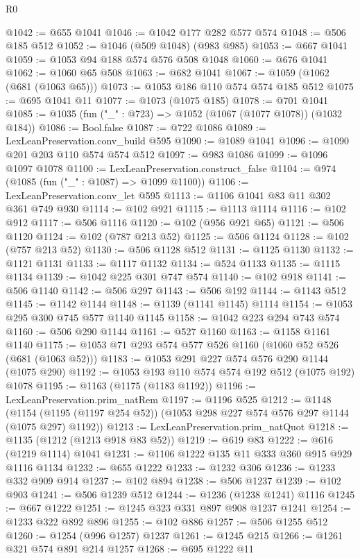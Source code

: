 \begin{lexlean}{R0}
\begin{coremodule}
@1042 := @655 @1041
@1046 := @1042 @177 @282 @577 @574
@1048 := @506 @185 @512
@1052 := @1046 (@509 @1048) (@983 @985)
@1053 := @667 @1041
@1059 := @1053 @94 @188 @574 @576 @508 @1048
@1060 := @676 @1041
@1062 := @1060 @65 @508
@1063 := @682 @1041
@1067 := @1059 (@1062 (@681 (@1063 @65)))
@1073 := @1053 @186 @110 @574 @574 @185 @512
@1075 := @695 @1041 @11
@1077 := @1073 (@1075 @185)
@1078 := @701 @1041
@1085 := @1035 (fun ("_" : @723) => @1052 (@1067 (@1077 @1078)) (@1032 @184))
@1086 := Bool.false
@1087 := @722 @1086
@1089 := LexLeanPreservation.conv_build @595
@1090 := @1089 @1041
@1096 := @1090 @201 @203 @110 @574 @574 @512
@1097 := @983 @1086
@1099 := @1096 @1097 @1078
@1100 := LexLeanPreservation.construct_false
@1104 := @974 (@1085 (fun ("_" : @1087) => @1099 @1100))
@1106 := LexLeanPreservation.conv_let @595
@1113 := @1106 @1041 @83 @11 @302 @361 @749 @930
@1114 := @102 @921
@1115 := @1113 @1114
@1116 := @102 @912
@1117 := @506 @1116
@1120 := @102 (@956 @921 @65)
@1121 := @506 @1120
@1124 := @102 (@787 @213 @52)
@1125 := @506 @1124
@1128 := @102 (@757 @213 @52)
@1130 := @506 @1128 @512
@1131 := @1125 @1130
@1132 := @1121 @1131
@1133 := @1117 @1132
@1134 := @524 @1133
@1135 := @1115 @1134
@1139 := @1042 @225 @301 @747 @574
@1140 := @102 @918
@1141 := @506 @1140
@1142 := @506 @297
@1143 := @506 @192
@1144 := @1143 @512
@1145 := @1142 @1144
@1148 := @1139 (@1141 @1145) @1114
@1154 := @1053 @295 @300 @745 @577 @1140 @1145
@1158 := @1042 @223 @294 @743 @574
@1160 := @506 @290 @1144
@1161 := @527 @1160
@1163 := @1158 @1161 @1140
@1175 := @1053 @71 @293 @574 @577 @526 @1160 (@1060 @52 @526 (@681 (@1063 @52)))
@1183 := @1053 @291 @227 @574 @576 @290 @1144 (@1075 @290)
@1192 := @1053 @193 @110 @574 @574 @192 @512 (@1075 @192) @1078
@1195 := @1163 (@1175 (@1183 @1192))
@1196 := LexLeanPreservation.prim_natRem
@1197 := @1196 @525
@1212 := @1148
    (@1154 (@1195 (@1197 @254 @52)) (@1053 @298 @227 @574 @576 @297 @1144 (@1075 @297) @1192))
@1213 := LexLeanPreservation.prim_natQuot
@1218 := @1135 (@1212 (@1213 @918 @83 @52))
@1219 := @619 @83
@1222 := @616 (@1219 @1114) @1041
@1231 := @1106 @1222 @135 @11 @333 @360 @915 @929 @1116 @1134
@1232 := @655 @1222
@1233 := @1232 @306
@1236 := @1233 @332 @909 @914
@1237 := @102 @894
@1238 := @506 @1237
@1239 := @102 @903
@1241 := @506 @1239 @512
@1244 := @1236 (@1238 @1241) @1116
@1245 := @667 @1222
@1251 := @1245 @323 @331 @897 @908 @1237 @1241
@1254 := @1233 @322 @892 @896
@1255 := @102 @886
@1257 := @506 @1255 @512
@1260 := @1254 (@996 @1257) @1237
@1261 := @1245 @215
@1266 := @1261 @321 @574 @891 @214 @1257
@1268 := @695 @1222 @11

\end{coremodule}
\end{lexlean}
